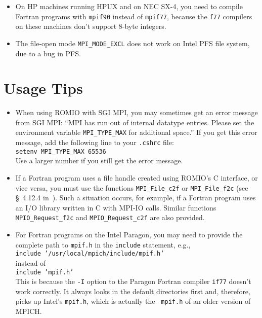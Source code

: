 \begin{itemize}
\item On HP machines running HPUX and on NEC SX-4, you need to compile
Fortran programs with {\tt mpif90} instead of {\tt mpif77}, because
the {\tt f77} compilers on these machines don't support 8-byte integers.

\item The file-open mode {\tt MPI\_MODE\_EXCL} does not work on Intel
PFS file system, due to a bug in PFS.

\end{itemize}


%
%
\section{Usage Tips}
\begin{itemize}
\item When using ROMIO with SGI MPI, you may
sometimes get an error message from SGI MPI: ``MPI has run out of
internal datatype entries. Please set the environment variable
{\tt MPI\_TYPE\_MAX} for additional space.'' If you get this error message,
add the following line to your {\tt .cshrc} file:\\
\hspace*{.4in} {\tt setenv MPI\_TYPE\_MAX 65536}\\
Use a larger number if you still get the error message.
\item If a Fortran program uses a file handle created using ROMIO's C
interface, or vice versa, you must use the functions {\tt MPI\_File\_c2f} 
or {\tt MPI\_File\_f2c} (see \S~4.12.4 in~\cite{mpi97a}). Such a
situation occurs, for example, if a Fortran program uses an I/O
library written in C 
with MPI-IO calls. Similar functions {\tt MPIO\_Request\_f2c} and
{\tt MPIO\_Request\_c2f} are also provided.
\item For Fortran programs on the Intel Paragon, you may need
to provide the complete path to {\tt mpif.h} in the {\tt include}
statement, e.g., \\
\hspace*{.4in} {\tt include '/usr/local/mpich/include/mpif.h'}\\
instead of \\
\hspace*{.4in} {\tt include 'mpif.h'}\\ 
This is because the {\tt -I}
option to the Paragon Fortran compiler {\tt if77} doesn't work
correctly. It always looks in the default directories first and,
therefore, picks up Intel's {\tt mpif.h}, which is actually the {\tt
mpif.h} of an older version of MPICH.

\end{itemize}

